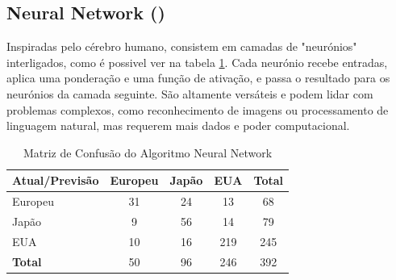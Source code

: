 \documentclass[conference]{IEEEtran}
\begin{document}
\subsection{Neural Network (\cite{neural})}
Inspiradas pelo cérebro humano, consistem em camadas de "neurónios" interligados, como é possivel ver na tabela \ref{tab:conf_matrix_neural}.
Cada neurónio recebe entradas, aplica uma ponderação e uma função de ativação, e passa o resultado para os neurónios da camada seguinte.
São altamente versáteis e podem lidar com problemas complexos, como reconhecimento de imagens ou processamento de linguagem natural,
mas requerem mais dados e poder computacional.
\begin{table}[!ht]
	\centering
	\begin{tabular}{lcccc}
		\toprule
		\textbf{Atual/Previsão} & \textbf{Europeu} & \textbf{Japão} & \textbf{EUA} & \textbf{Total} \\
		\midrule
		Europeu                 & 31               & 24             & 13           & 68             \\
		Japão                   & 9                & 56             & 14           & 79             \\
		EUA                     & 10               & 16             & 219          & 245            \\
		\midrule
		\textbf{Total}          & 50               & 96             & 246          & 392            \\
		\bottomrule
	\end{tabular}
	\caption{Matriz de Confusão do Algoritmo Neural Network}
	\label{tab:conf_matrix_neural}

\end{table}

\end{document}
